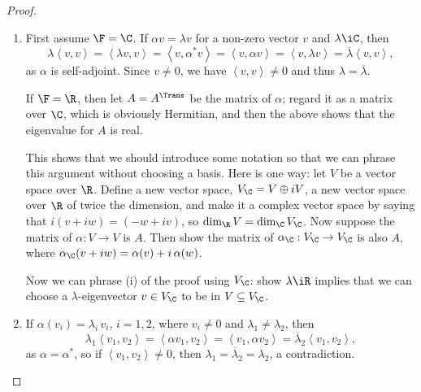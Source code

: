 \begin{proof}
\mbox{}
\begin{enumerate}
	\item First assume $\F=\C$. If $\alpha v = \lambda v$ for a non-zero vector $v$ and $\lambda\iC$, then %
	\begin{equation*}
		\lambda\left\langle v,v \right\rangle
		= \left\langle \lambda v,v \right\rangle
		= \left\langle v,\alpha^* v \right\rangle
		= \left\langle v,\alpha v \right\rangle
		= \left\langle v,\lambda v \right\rangle
		= \overline{\lambda} \left\langle v,v \right\rangle,
	\end{equation*}
	as $\alpha$ is self-adjoint. Since $v\neq 0$, we have $\left\langle v,v \right\rangle\neq 0$ and thus $\lambda=\overline{\lambda}$. %
	
	If $\F=\R$, then let $A=A^\Trans$ be the matrix of $\alpha$; regard it as a matrix over $\C$, which is obviously Hermitian, and then the above shows that the eigenvalue for $A$ is real. %
	
\smallskip

	\begin{remark}
		This shows that we should introduce some notation so that we can phrase this argument without choosing a basis. Here is one way: let $V$ be a vector space over $\R$. Define a new vector space, $V_\C = V\oplus iV$, a new vector space over $\R$ of twice the dimension, and make it a complex vector space by saying that $i\left( v+iw \right)=(-w+iv)$, so $\dim_\R V = \dim_\C V_\C$. Now suppose the matrix of $\alpha:V\to V$ is $A$. Then show the matrix of $\alpha_\C :V_\C\to V_\C$ is also $A$, where $\alpha_\C(v+iw) = \alpha(v)+i\,\alpha(w)$. %
	\end{remark}
	
	Now we can phrase (i) of the proof using $V_\C$: show $\lambda\iR$ implies that we can choose a  $\lambda$-eigenvector $v\in V_\C$ to be in $V\subseteq V_\C$. %
	
	\item If $\alpha(v_i)=\lambda_i\,v_i$, $i=1,2$, where $v_i\neq 0$ and $\lambda_1\neq \lambda_2$, then %
	\begin{equation*}
		\lambda_1\left\langle v_1,v_2 \right\rangle
		= \left\langle \alpha v_1,v_2 \right\rangle
		= \left\langle v_1,\alpha v_2 \right\rangle
		= \overline{\lambda}_2 \left\langle v_1,v_2 \right\rangle,
	\end{equation*}
	as $\alpha=\alpha^*$, so if $\left\langle v_1,v_2 \right\rangle\neq 0$, then $\lambda_1=\overline{\lambda}_2 = \lambda_2$, a contradiction. %
	

\end{enumerate}
\end{proof}
